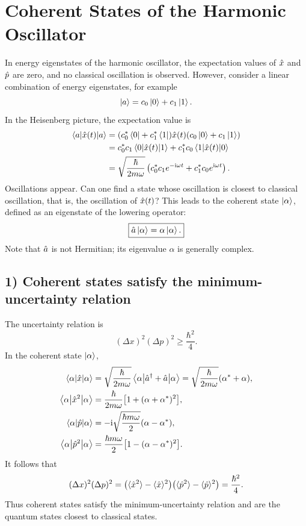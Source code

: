 \section{Coherent States of the Harmonic Oscillator}
In energy eigenstates of the harmonic oscillator, the expectation values of $\hat{x}$ and $\hat{p}$ are zero, and no classical oscillation is observed. However, consider a linear combination of energy eigenstates, for example
\begin{equation}
\left|a\right\rangle=c_0\left|0\right\rangle+c_1\left|1\right\rangle.
\end{equation}
In the Heisenberg picture, the expectation value is
\begin{equation}
\begin{split}
\left\langle a\middle|\hat{x}(t)\middle|a\right\rangle
&=(c_0^*\left\langle0\right|+c_1^*\left\langle1\right|)\hat{x}(t)(c_0\left|0\right\rangle+c_1\left|1\right\rangle)\\
&=c_0^*c_1\left\langle0\middle|\hat{x}(t)\middle|1\right\rangle+c_1^*c_0\left\langle1\middle|\hat{x}(t)\middle|0\right\rangle\\
&=\sqrt{\frac\hbar{2m\omega}}
\left(c_0^*c_1e^{-\mathrm{i}\omega t}+c_1^*c_0e^{\mathrm{i}\omega t}\right).
\end{split}
\end{equation}
Oscillations appear. Can one find a state whose oscillation is closest to classical oscillation, that is, the oscillation of $\hat{x}(t)$? This leads to the coherent state $\left|\alpha\right\rangle$, defined as an eigenstate of the lowering operator:
\begin{equation}
\boxed{\hat{a}\left|\alpha\right\rangle=\alpha\left|\alpha\right\rangle.}
\end{equation}
Note that $\hat{a}$ is not Hermitian; its eigenvalue $\alpha$ is generally complex.

\subsection*{1) Coherent states satisfy the minimum-uncertainty relation}
The uncertainty relation is
\begin{equation}
(\Delta x)^2(\Delta p)^2\ge\frac{\hbar^2}{4}.
\end{equation}
In the coherent state $\left|\alpha\right\rangle$,
\begin{equation}
\begin{split}
\left\langle\alpha\middle|\hat{x}\middle|\alpha\right\rangle
&=\sqrt{\frac\hbar{2m\omega}}\left\langle\alpha\middle|\hat{a}^{\dagger}+\hat{a}\middle|\alpha\right\rangle
=\sqrt{\frac\hbar{2m\omega}}(\alpha^*+\alpha),\\
\left\langle\alpha\middle|\hat{x}^2\middle|\alpha\right\rangle
&=\frac\hbar{2m\omega}\bigl[1+(\alpha+\alpha^*)^2\bigr],\\
\left\langle\alpha\middle|\hat{p}\middle|\alpha\right\rangle
&=-\mathrm{i}\sqrt{\frac{\hbar m\omega}{2}}(\alpha-\alpha^*),\\
\left\langle\alpha\middle|\hat{p}^2\middle|\alpha\right\rangle
&=\frac{\hbar m\omega}{2}\bigl[1-(\alpha-\alpha^*)^2\bigr].
\end{split}
\end{equation}
It follows that
\begin{equation}
(\Delta x)^2(\Delta p)^2
=\bigl(\langle\hat{x}^2\rangle-\langle\hat{x}\rangle^2\bigr)
\bigl(\langle\hat{p}^2\rangle-\langle\hat{p}\rangle^2\bigr)
=\frac{\hbar^2}{4}.
\end{equation}
Thus coherent states satisfy the minimum-uncertainty relation and are the quantum states closest to classical states.

